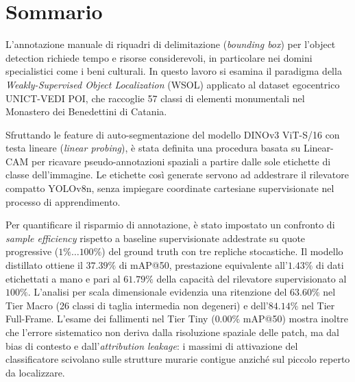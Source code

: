 \cleardoublepage
{}
{}
\chapter*{Sommario}

L'annotazione manuale di riquadri di delimitazione (\textit{bounding box}) per l'object detection richiede tempo e risorse considerevoli, in particolare nei domini specialistici come i beni culturali. In questo lavoro si esamina il paradigma della \textit{Weakly-Supervised Object Localization} (WSOL) applicato al dataset egocentrico UNICT-VEDI POI, che raccoglie 57 classi di elementi monumentali nel Monastero dei Benedettini di Catania.

Sfruttando le feature di auto-segmentazione del modello DINOv3 ViT-S/16 con testa lineare (\textit{linear probing}), è stata definita una procedura basata su Linear-CAM per ricavare pseudo-annotazioni spaziali a partire dalle sole etichette di classe dell'immagine. Le etichette così generate servono ad addestrare il rilevatore compatto YOLOv8n, senza impiegare coordinate cartesiane supervisionate nel processo di apprendimento.

Per quantificare il risparmio di annotazione, è stato impostato un confronto di \textit{sample efficiency} rispetto a baseline supervisionate addestrate su quote progressive ($1\% \dots 100\%$) del ground truth con tre repliche stocastiche. Il modello distillato ottiene il $37.39\%$ di mAP@50, prestazione equivalente all'$1.43\%$ di dati etichettati a mano e pari al $61.79\%$ della capacità del rilevatore supervisionato al $100\%$. L'analisi per scala dimensionale evidenzia una ritenzione del $63.60\%$ nel Tier Macro (26 classi di taglia intermedia non degeneri) e dell'$84.14\%$ nel Tier Full-Frame. L'esame dei fallimenti nel Tier Tiny ($0.00\%$ mAP@50) mostra inoltre che l'errore sistematico non deriva dalla risoluzione spaziale delle patch, ma dal bias di contesto e dall'\textit{attribution leakage}: i massimi di attivazione del classificatore scivolano sulle strutture murarie contigue anziché sul piccolo reperto da localizzare.
